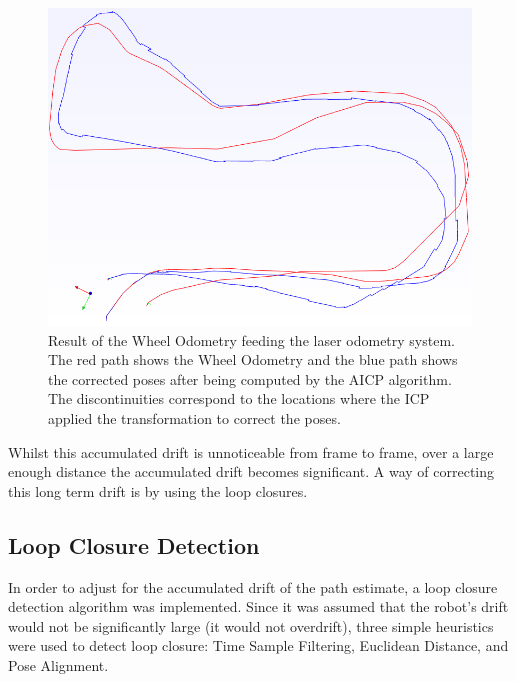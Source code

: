 \documentclass[11pt]{article}
\begin{document}
\begin{figure}
\begin{minipage}{0.65\textwidth}
\centering
\includegraphics[width=\textwidth]{LaserOdometry1}
\end{minipage} \hfill
\begin{minipage}{0.35\textwidth}
\centering
\caption[t]{Result of the Wheel Odometry feeding the laser odometry system. The red path shows the Wheel Odometry and the blue path shows the corrected poses after being computed by the AICP algorithm. The discontinuities correspond to the locations where the ICP applied the transformation to correct the poses.}
\label{fig:LaserOdometry1}	
\end{minipage}				
\end{figure}

Whilst this accumulated drift is unnoticeable from frame to frame, over a large enough distance the accumulated drift becomes significant. A way of correcting this long term drift is by using the  loop closures.
	
	\subsection{Loop Closure Detection}
	\label{subs:LoopCl}

In order to adjust for the accumulated drift of the path estimate, a loop closure detection algorithm was implemented. Since it was assumed that the robot's drift would not be significantly large (it would not overdrift), three simple heuristics were used to detect loop closure: Time Sample Filtering, Euclidean Distance, and Pose Alignment. 
\end{document}
